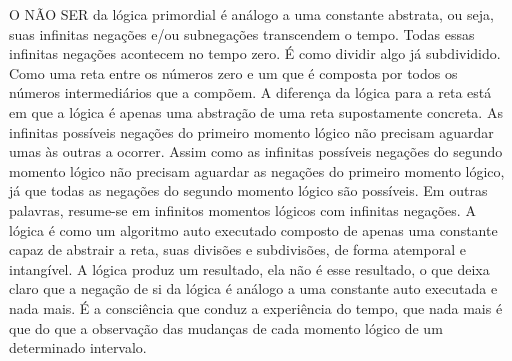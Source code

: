 O NÃO SER da lógica primordial é análogo a uma constante abstrata, ou seja, suas infinitas negações e/ou subnegações transcendem o tempo. Todas essas infinitas negações acontecem no tempo zero. É como dividir algo já subdividido. Como uma reta entre os números zero e um que é composta por todos os números intermediários que a compõem. A diferença da lógica para a reta está em que a lógica é apenas uma abstração de uma reta supostamente concreta.
As infinitas possíveis negações do primeiro momento lógico não precisam aguardar umas às outras a ocorrer. Assim como as infinitas possíveis negações do segundo momento lógico não precisam aguardar as negações do primeiro momento lógico, já que todas as negações do segundo momento lógico são possíveis. Em outras palavras, resume-se em infinitos momentos lógicos com infinitas negações. A lógica é como um algoritmo auto executado composto de apenas uma constante capaz de abstrair a reta, suas divisões e subdivisões, de forma atemporal e intangível. A lógica produz um resultado, ela não é esse resultado, o que deixa claro que a negação de si da lógica é análogo a uma constante auto executada e nada mais.
É a consciência que conduz a experiência do tempo, que nada mais é que do que a observação das mudanças de cada momento lógico de um determinado intervalo.

